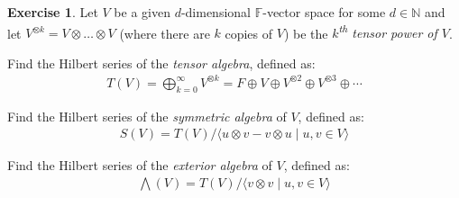 \documentclass[svgnames]{article}
\theoremstyle{definition}
\newtheorem{Exercise}{Exercise}
\theoremstyle{remark}
\theoremstyle{underline}
\theoremstyle{underline}
\renewcommand{\th}{\textsuperscript{th}\xspace}
\begin{document}
	\begin{Exercise}
		Let $V$ be a given $d$-dimensional $\mathbb F$-vector space for some $d \in \mathbb N$ and let $V^{\otimes k} = V \otimes \dots \otimes V$ (where there are $k$ copies of $V$) be the \emph{$k$\th tensor power of $V$}.
		\begin{subquests}
			\item Find the Hilbert series of the \emph{tensor algebra}, defined as:
			\begin{gather*}
				T(V) = \bigoplus_{k=0}^{\infty} V^{\otimes k} = F \oplus V \oplus V^{\otimes 2} \oplus V^{\otimes 3} \oplus \cdots
			\end{gather*}			

			\item Find the Hilbert series of the \emph{symmetric algebra} of $V$, defined as:
			\begin{gather*}
			 	S(V) = T(V)/\langle u \otimes v - v \otimes u \mid u,v \in V \rangle
			 \end{gather*} 

			\item Find the Hilbert series of the \emph{exterior algebra} of $V$, defined as:
			\begin{gather*}
				\bigwedge(V) = T(V)/\langle v \otimes v \mid u,v \in V \rangle
			\end{gather*}
		\end{subquests}
	\end{Exercise}
\end{document}
